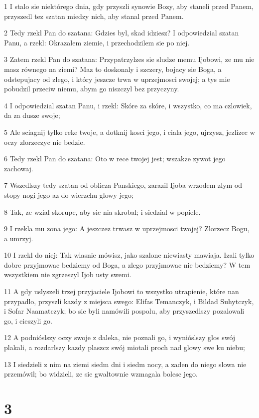 \par 1 I stalo sie niektórego dnia, gdy przyszli synowie Bozy, aby staneli przed Panem, przyszedl tez szatan miedzy nich, aby stanal przed Panem.
\par 2 Tedy rzekl Pan do szatana: Gdzies byl, skad idziesz? I odpowiedzial szatan Panu, a rzekl: Okrazalem ziemie, i przechodzilem sie po niej.
\par 3 Zatem rzekl Pan do szatana: Przypatrzylzes sie sludze memu Ijobowi, ze mu nie masz równego na ziemi? Maz to doskonaly i szczery, bojacy sie Boga, a odstepujacy od zlego, i który jeszcze trwa w uprzejmosci swojej; a tys mie pobudzil przeciw niemu, abym go niszczyl bez przyczyny.
\par 4 I odpowiedzial szatan Panu, i rzekl: Skóre za skóre, i wszystko, co ma czlowiek, da za dusze swoje;
\par 5 Ale sciagnij tylko reke twoje, a dotknij kosci jego, i ciala jego, ujrzysz, jezlizec w oczy zlorzeczyc nie bedzie.
\par 6 Tedy rzekl Pan do szatana: Oto w rece twojej jest; wszakze zywot jego zachowaj.
\par 7 Wszedlszy tedy szatan od oblicza Panskiego, zarazil Ijoba wrzodem zlym od stopy nogi jego az do wierzchu glowy jego;
\par 8 Tak, ze wzial skorupe, aby sie nia skrobal; i siedzial w popiele.
\par 9 I rzekla mu zona jego: A jeszczez trwasz w uprzejmosci twojej? Zlorzecz Bogu, a umrzyj.
\par 10 I rzekl do niej: Tak wlasnie mówisz, jako szalone niewiasty mawiaja. Izali tylko dobre przyjmowac bedziemy od Boga, a zlego przyjmowac nie bedziemy? W tem wszystkiem nie zgrzeszyl Ijob usty swemi.
\par 11 A gdy uslyszeli trzej przyjaciele Ijobowi to wszystko utrapienie, które nan przypadlo, przyszli kazdy z miejsca swego: Elifas Temanczyk, i Bildad Suhytczyk, i Sofar Naamatczyk; bo sie byli namówili pospolu, aby przyszedlszy pozalowali go, i cieszyli go.
\par 12 A podnióslszy oczy swoje z daleka, nie poznali go, i wynióslszy glos swój plakali, a rozdarlszy kazdy plaszcz swój miotali proch nad glowy swe ku niebu;
\par 13 I siedzieli z nim na ziemi siedm dni i siedm nocy, a zaden do niego slowa nie przemówil; bo widzieli, ze sie gwaltownie wzmagala bolesc jego.

\chapter{3}

